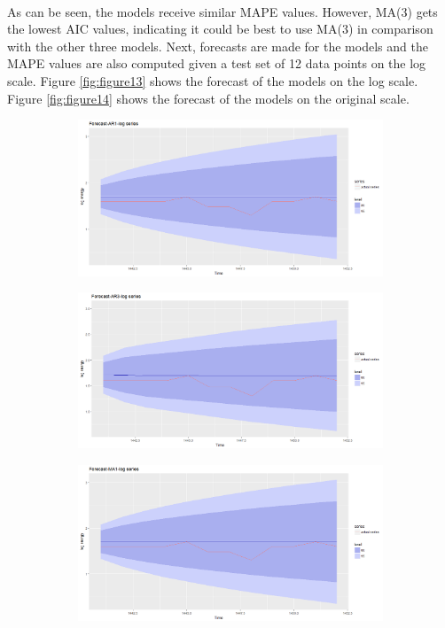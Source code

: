 \documentclass[12pt]{article}
\begin{document}
\paragraph{}
As can be seen, the models receive similar MAPE values. However, MA(3) gets the lowest AIC values, indicating it could be best to use MA(3) in comparison with the other three models. Next, forecasts are made for the models and the MAPE values are also computed given a test set of 12 data points on the log scale. Figure \ref{fig:figure13}  shows the forecast of the models on the log scale. Figure \ref{fig:figure14}  shows the forecast of the models on the original scale.
\begin{figure}[H]
  \centering
  \begin{subfigure}[b]{0.49\linewidth}
    \includegraphics[width=\linewidth]{figure13-1.png}
  \end{subfigure}
  \begin{subfigure}[b]{0.49\linewidth}
    \includegraphics[width=\linewidth]{figure13-2.png}
  \end{subfigure}
  \begin{subfigure}[b]{0.49\linewidth}
    \includegraphics[width=\linewidth]{figure13-3.png}

\end{subfigure}
\end{figure}
\end{document}
